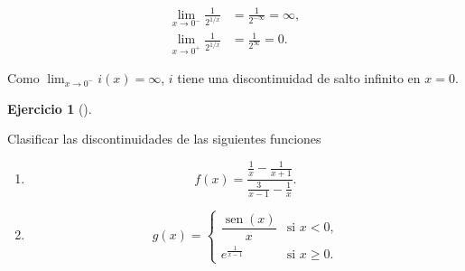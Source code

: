 \documentclass[
  spanish,
  a4paper,
]{scrreport}
\theoremstyle{definition}
\newtheorem{exercise}{Ejercicio}[chapter]
\theoremstyle{remark}
\begin{document}
\begin{tcolorbox}
\begin{enumerate}
  \begin{align*}
  \lim_{x\to 0^-} \frac{1}{2^{1/x}}
  &= \frac{1}{2^{-\infty}} 
  = \infty, \\
  \lim_{x\to 0^+} \frac{1}{2^{1/x}}
  &= \frac{1}{2^{\infty}} 
  = 0.
  \end{align*}

  Como \(\lim_{x\to 0^-} i(x)=\infty\), \(i\) tiene una discontinuidad
  de salto infinito en \(x=0\).
\end{enumerate}

\end{tcolorbox}

\begin{exercise}[]\protect\hypertarget{exr-clasificacion-dicontinuidades-2}{}\label{exr-clasificacion-dicontinuidades-2}

Clasificar las discontinuidades de las siguientes funciones

\begin{enumerate}
\def\labelenumi{\alph{enumi}.}
\item
  \[
  f(x)=\frac{\frac{1}{x}-\frac{1}{x+1}}{\frac{3}{x-1}-\frac{1}{x}}.
  \]
\item
  \[
  g(x)=
  \begin{cases}
  \dfrac{\operatorname{sen}(x)}{x} & \text{si $x<0$,} \\ 
  e^{\frac{1}{x-1}} & \text{si $x\geq 0$.}
  \end{cases}
  \]
\end{enumerate}

\end{exercise}
\end{document}
